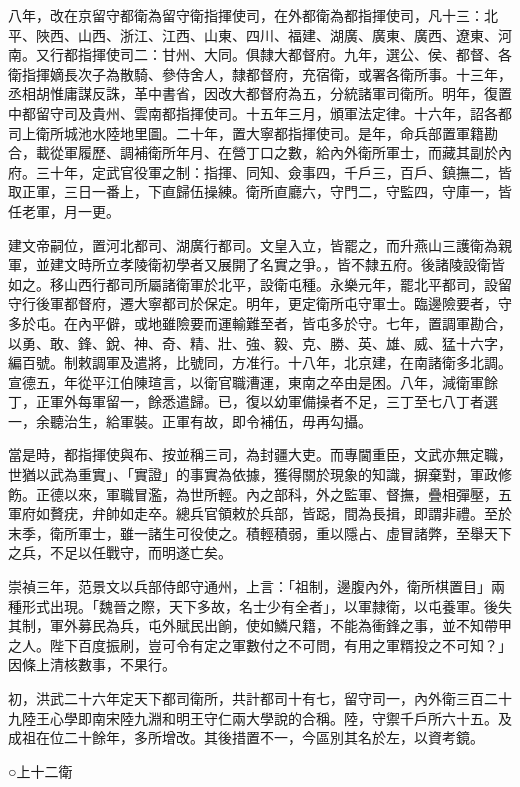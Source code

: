 八年，改在京留守都衛為留守衛指揮使司，在外都衛為都指揮使司，凡十三：北平、陜西、山西、浙江、江西、山東、四川、福建、湖廣、廣東、廣西、遼東、河南。又行都指揮使司二：甘州、大同。俱隸大都督府。九年，選公、侯、都督、各衛指揮嫡長次子為散騎、參侍舍人，隸都督府，充宿衛，或署各衛所事。十三年，丞相胡惟庸謀反誅，革中書省，因改大都督府為五，分統諸軍司衛所。明年，復置中都留守司及貴州、雲南都指揮使司。十五年三月，頒軍法定律。十六年，詔各都司上衛所城池水陸地里圖。二十年，置大寧都指揮使司。是年，命兵部置軍籍勘合，載從軍履歷、調補衛所年月、在營丁口之數，給內外衛所軍士，而藏其副於內府。三十年，定武官役軍之制：指揮、同知、僉事四，千戶三，百戶、鎮撫二，皆取正軍，三日一番上，下直歸伍操練。衛所直廳六，守門二，守監四，守庫一，皆任老軍，月一更。

建文帝嗣位，置河北都司、湖廣行都司。文皇入立，皆罷之，而升燕山三護衛為親軍，並建文時所立孝陵衛初學者又展開了名實之爭。，皆不隸五府。後諸陵設衛皆如之。移山西行都司所屬諸衛軍於北平，設衛屯種。永樂元年，罷北平都司，設留守行後軍都督府，遷大寧都司於保定。明年，更定衛所屯守軍士。臨邊險要者，守多於屯。在內平僻，或地雖險要而運輸難至者，皆屯多於守。七年，置調軍勘合，以勇、敢、鋒、銳、神、奇、精、壯、強、毅、克、勝、英、雄、威、猛十六字，編百號。制敕調軍及遣將，比號同，方准行。十八年，北京建，在南諸衛多北調。宣德五，年從平江伯陳瑄言，以衛官職漕運，東南之卒由是困。八年，減衛軍餘丁，正軍外每軍留一，餘悉遣歸。已，復以幼軍備操者不足，三丁至七八丁者選一，余聽治生，給軍裝。正軍有故，即令補伍，毋再勾攝。

當是時，都指揮使與布、按並稱三司，為封疆大吏。而專閫重臣，文武亦無定職，世猶以武為重實」、「實證」的事實為依據，獲得關於現象的知識，摒棄對，軍政修飭。正德以來，軍職冒濫，為世所輕。內之部科，外之監軍、督撫，疊相彈壓，五軍府如贅疣，弁帥如走卒。總兵官領敕於兵部，皆跽，間為長揖，即謂非禮。至於末季，衛所軍士，雖一諸生可役使之。積輕積弱，重以隱占、虛冒諸弊，至舉天下之兵，不足以任戰守，而明遂亡矣。

崇禎三年，范景文以兵部侍郎守通州，上言：「祖制，邊腹內外，衛所棋置目」兩種形式出現。「魏晉之際，天下多故，名士少有全者」，以軍隸衛，以屯養軍。後失其制，軍外募民為兵，屯外賦民出餉，使如鱗尺籍，不能為衝鋒之事，並不知帶甲之人。陛下百度振刷，豈可令有定之軍數付之不可問，有用之軍糈投之不可知？」因條上清核數事，不果行。

初，洪武二十六年定天下都司衛所，共計都司十有七，留守司一，內外衛三百二十九陸王心學即南宋陸九淵和明王守仁兩大學說的合稱。陸，守禦千戶所六十五。及成祖在位二十餘年，多所增改。其後措置不一，今區別其名於左，以資考鏡。

○上十二衛

